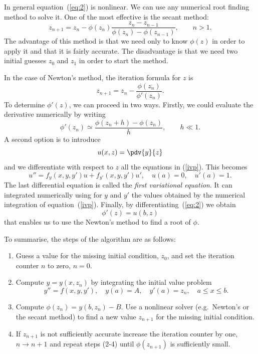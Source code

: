 In general equation~(\ref{eq:2}) is nonlinear.  We can use any
numerical root finding method to solve it.  One of the most effective
is the secant method:
%
\begin{equation*}
  z_{n+1} = z_{n} - \phi(z_n) \frac{z_n - z_{n-1}}
  {\phi(z_n)-\phi(z_{n-1})} ,
  \qquad n > 1.
\end{equation*}
%
The advantage of this method is that we need only to know $\phi(z)$ in
order to apply it and that it is fairly accurate.  The disadvantage is
that we need two initial guesses $z_0$ and $z_1$ in order to start the
method.

\medskip

In the case of Newton's method, the iteration formula for $z$ is
%
\begin{equation}
 z_{n+1} = z_n-\frac{\phi(z_n)}{\phi'(z_n)}.
 \label{eq:3}
\end{equation}
%
To determine $\phi'(z)$, we can proceed in two ways.  Firstly, we
could evaluate the derivative numerically by writing
%
\begin{equation*}
  \phi'(z_n) \simeq \frac{\phi(z_n+h)-\phi(z_n)}{h}, \qquad h \ll 1.
\end{equation*}
%
A second option is to introduce
%
\begin{equation*}
  u(x,z)=\pdv{y}{z}
\end{equation*}
%
and we differentiate with respect to $z$ all the equations in
(\ref{ivp}). This becomes
%
\begin{equation*}
  u'' = f_y(x,y,y') u + f_{y'}(x,y,y') u', \quad u(a)=0, \quad u'(a)=1.
\end{equation*}
%
The last differential equation is called the \textit{first variational
  equation}.  It can integrated numerically using for $y$ and $y'$ the
values obtained by the numerical integration of equation~(\ref{ivp}).
Finally, by differentiating~(\ref{eq:2}) we obtain
%
\begin{equation*}
  \phi'(z)=u(b,z)
\end{equation*}
%
that enables us to use the Newton's method to find a root of $\phi$.

\bigskip

To summarise, the steps of the algorithm are as follows:
%
\begin{enumerate}
\item Guess a value for the missing initial condition, $z_0$, and set
  the iteration counter $n$ to zero, $n=0$.
\item Compute $y=y(x,z_n)$ by integrating the initial value problem
  \begin{equation*}
    y''=f(x,y,y'), \quad y(a)=A, \quad y'(a)=z_n, \quad a\le x\le b.
  \end{equation*}
%
\item Compute $\phi(z_n) = y(b,z_n) - B$.  Use a nonlinear solver
  (e.g.\ Newton's or the secant method) to find a new value $z_{n+1}$
  for the missing initial condition.
%
\item If $z_{n+1}$ is not sufficiently accurate increase the iteration
  counter by one, $n \to n + 1$ and repeat steps (2-4) until
  $\phi(z_{n+1})$ is sufficiently small.
%
\end{enumerate}

